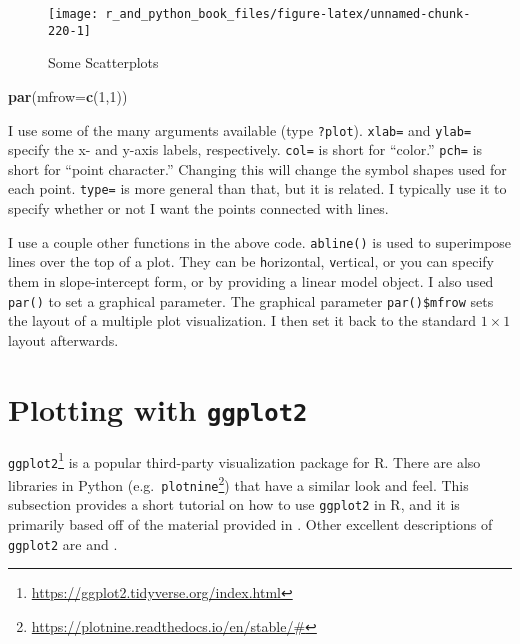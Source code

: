 \documentclass[12pt,krantz2]{krantz}
\makeatletter
\newenvironment{Shaded}{\begin{snugshade}}{\end{snugshade}}
\newcommand{\DataTypeTok}[1]{\textcolor[rgb]{0.27,0.27,0.27}{#1}}
\newcommand{\DecValTok}[1]{\textcolor[rgb]{0.06,0.06,0.06}{#1}}
\newcommand{\KeywordTok}[1]{\textcolor[rgb]{0.27,0.27,0.27}{\textbf{#1}}}
\newcommand{\NormalTok}[1]{#1}
\renewcommand{\href}[2]{#2\footnote{\url{#1}}}
\newenvironment{kframe}{%
\medskip{}
\setlength{\fboxsep}{.8em}
 \def\at@end@of@kframe{}%
 \ifinner\ifhmode%
  \def\at@end@of@kframe{\end{minipage}}%
  \begin{minipage}{\columnwidth}%
 \fi\fi%
 \def\FrameCommand##1{\hskip\@totalleftmargin \hskip-\fboxsep
 \colorbox{shadecolor}{##1}\hskip-\fboxsep
     \hskip-\linewidth \hskip-\@totalleftmargin \hskip\columnwidth}%
 \MakeFramed {\advance\hsize-\width
   \@totalleftmargin\z@ \linewidth\hsize
   \@setminipage}}%
 {\par\unskip\endMakeFramed%
 \at@end@of@kframe}
\renewenvironment{Shaded}{\begin{kframe}}{\end{kframe}}
\makeatother
\begin{document}
\begin{figure}

{\centering \texttt{[image: r\_and\_python\_book\_files/figure-latex/unnamed-chunk-220-1]} 

}

\caption{Some Scatterplots}\label{fig:unnamed-chunk-220}
\end{figure}

\begin{Shaded}
\begin{Highlighting}[]
\KeywordTok{par}\NormalTok{(}\DataTypeTok{mfrow=}\KeywordTok{c}\NormalTok{(}\DecValTok{1}\NormalTok{,}\DecValTok{1}\NormalTok{))}
\end{Highlighting}
\end{Shaded}

I use some of the many arguments available (type \texttt{?plot}). \texttt{xlab=} and \texttt{ylab=} specify the x- and y-axis labels, respectively. \texttt{col=} is short for ``color.'' \texttt{pch=} is short for ``point character.'' Changing this will change the symbol shapes used for each point. \texttt{type=} is more general than that, but it is related. I typically use it to specify whether or not I want the points connected with lines.

I use a couple other functions in the above code. \texttt{abline()} is used to superimpose lines over the top of a plot. They can be \texttt{h}orizontal, \texttt{v}ertical, or you can specify them in slope-intercept form, or by providing a linear model object. I also used \texttt{par()} to set a graphical parameter. The graphical parameter \texttt{par()\$mfrow} sets the layout of a multiple plot visualization. I then set it back to the standard \(1 \times 1\) layout afterwards.

\hypertarget{plotting-with-ggplot2}{%
\section{\texorpdfstring{Plotting with \texttt{ggplot2}}{Plotting with ggplot2}}\label{plotting-with-ggplot2}}

\href{https://ggplot2.tidyverse.org/index.html}{\texttt{ggplot2}} is a popular third-party visualization package for R. There are also libraries in Python (e.g.~\href{https://plotnine.readthedocs.io/en/stable/\#}{\texttt{plotnine}}) that have a similar look and feel. This subsection provides a short tutorial on how to use \texttt{ggplot2} in R, and it is primarily based off of the material provided in \citep{ggplot2}. Other excellent descriptions of \texttt{ggplot2} are \citep{r_in_action} and \citep{r_graphics_cookbook}.
\end{document}
